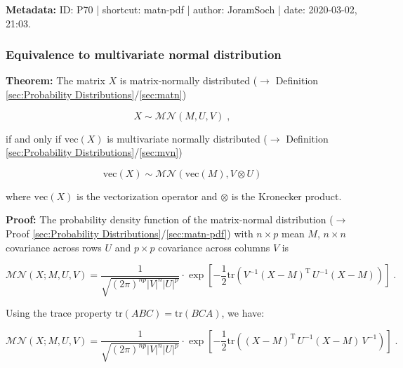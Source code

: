 \documentclass[a4paper,12pt,twoside]{book}
\begin{document}
\vspace{1em}
\textbf{Metadata:} ID: P70 | shortcut: matn-pdf | author: JoramSoch | date: 2020-03-02, 21:03.
\vspace{1em}



\subsubsection[\textbf{Equivalence to multivariate normal distribution}]{Equivalence to multivariate normal distribution} \label{sec:matn-mvn}
\setcounter{equation}{0}

\textbf{Theorem:} The matrix $X$ is matrix-normally distributed ($\rightarrow$ Definition \ref{sec:Probability Distributions}/\ref{sec:matn})

\begin{equation} \label{eq:matn-mvn-matn}
X \sim \mathcal{MN}(M, U, V) \; ,
\end{equation}

if and only if $\mathrm{vec}(X)$ is multivariate normally distributed ($\rightarrow$ Definition \ref{sec:Probability Distributions}/\ref{sec:mvn})

\begin{equation} \label{eq:matn-mvn-mvn}
\mathrm{vec}(X) \sim \mathcal{MN}(\mathrm{vec}(M), V \otimes U)
\end{equation}

where $\mathrm{vec}(X)$ is the vectorization operator and $\otimes$ is the Kronecker product.


\vspace{1em}
\textbf{Proof:} The probability density function of the matrix-normal distribution ($\rightarrow$ Proof \ref{sec:Probability Distributions}/\ref{sec:matn-pdf}) with $n \times p$ mean $M$, $n \times n$ covariance across rows $U$ and $p \times p$ covariance across columns $V$ is

\begin{equation} \label{eq:matn-mvn-matn-pdf}
\mathcal{MN}(X; M, U, V) = \frac{1}{\sqrt{(2\pi)^{np} |V|^n |U|^p}} \cdot \exp\left[-\frac{1}{2} \mathrm{tr}\left( V^{-1} (X-M)^\mathrm{T} \, U^{-1} (X-M) \right) \right] \; .
\end{equation}

Using the trace property $\mathrm{tr}(ABC) = \mathrm{tr}(BCA)$, we have:

\begin{equation} \label{eq:matn-mvn-matn-mvn-s1}
\mathcal{MN}(X; M, U, V) = \frac{1}{\sqrt{(2\pi)^{np} |V|^n |U|^p}} \cdot \exp\left[-\frac{1}{2} \mathrm{tr}\left( (X-M)^\mathrm{T} \, U^{-1} (X-M) \, V^{-1} \right) \right] \; .
\end{equation}
\end{document}
